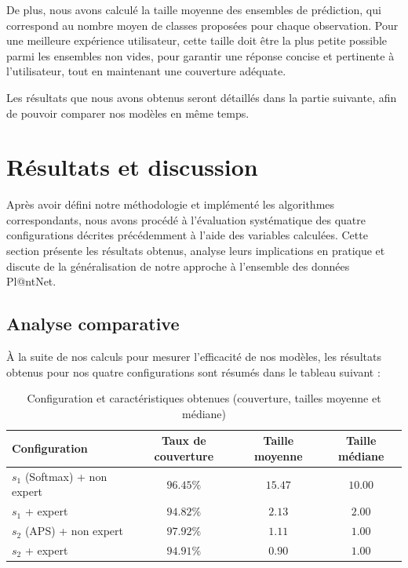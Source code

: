 \documentclass[a4paper,12pt]{article}
\begin{document}
\vspace{0.2cm}

De plus, nous avons calculé la taille moyenne des ensembles de prédiction, qui correspond au nombre moyen de classes proposées pour chaque observation. Pour une meilleure expérience utilisateur, cette taille doit être la plus petite possible parmi les ensembles non vides, pour garantir une réponse concise et pertinente à l'utilisateur, tout en maintenant une couverture adéquate.

\vspace{0.2cm}

Les résultats que nous avons obtenus seront détaillés dans la partie suivante, afin de pouvoir comparer nos modèles en même temps.


\section{Résultats et discussion}

Après avoir défini notre méthodologie et implémenté les algorithmes correspondants, nous avons procédé à l'évaluation systématique des quatre configurations décrites précédemment à l'aide des variables calculées. Cette section présente les résultats obtenus, analyse leurs implications en pratique et discute de la généralisation de notre approche à l'ensemble des données Pl@ntNet.


\subsection{Analyse comparative}

À la suite de nos calculs pour mesurer l'efficacité de nos modèles, les résultats obtenus pour nos quatre configurations sont résumés dans le tableau suivant :

\begin{table}[H]
\centering
\begin{tabular}{|l|c|c|c|}
    \hline
    \textbf{Configuration} & \textbf{Taux de couverture} & \textbf{Taille moyenne} & \textbf{Taille médiane} \\
    \hline
    $s_1$ (Softmax) + non expert & $96.45\%$ & $15.47$ & $10.00$ \\
    $s_1$ + expert & $94.82\%$ & $2.13$ & $2.00$ \\
    $s_2$ (APS) + non expert & $97.92\%$ & $1.11$ & $1.00$ \\
    $s_2$ + expert & $94.91\%$ & $0.90$ & $1.00$ \\
    \hline
    \end{tabular}
\caption{Configuration et caractéristiques obtenues (couverture, tailles moyenne et médiane)}
\label{tab3}
\end{table}
    
\end{document}
